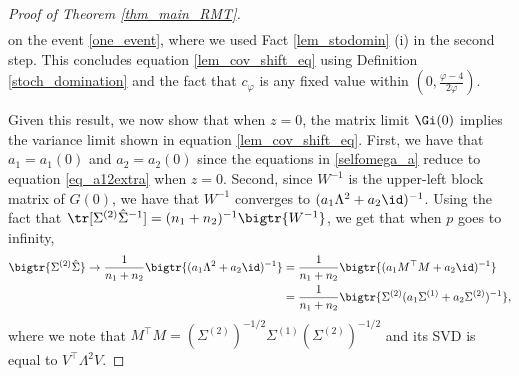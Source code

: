 \documentclass[aos,preprint]{imsart}
\begin{document}
\begin{proof}[Proof of Theorem \ref{thm_main_RMT}]
\begin{align*}
 \end{align*}
on the event \eqref{one_event}, where we used Fact \ref{lem_stodomin} (i) in the second step. 
This concludes equation \eqref{lem_cov_shift_eq} using Definition \ref{stoch_domination} and the fact that $c_{\varphi}$ is any fixed value within $(0, \frac{\varphi - 4}{2\varphi})$.  %

Given this result, we now show that when $z = 0$, the matrix limit $\Gi(0)$ implies the variance limit shown in equation \eqref{lem_cov_shift_eq}.
First, we have that $a_1 = a_1(0)$ and $a_2 = a_2(0)$ since the equations in \eqref{selfomega_a} reduce to equation \eqref{eq_a12extra} when $z=0$.
Second, since $W^{-1}$ is the upper-left block matrix of $G(0)$, we have that $W^{-1}$ converges to $ (a_1\Lambda^2 + a_2\id)^{-1} $.
Using the fact that $\tr[\Sigma^{(2)} \hat{\Sigma}^{-1}] = (n_1 + n_2)^{-1}\bigtr{W^{-1}} $, we get that when $p$ goes to infinity, %
\begin{align*}
  \bigtr{\Sigma^{(2)} \hat{\Sigma}} \rightarrow \frac{1}{n_1+n_2}\bigtr{(a_1 \Lambda^2 + a_2\id)^{-1}} &= \frac1{n_1+n_2}\bigtr{(a_1 M^{\top}M + a_2 \id)^{-1}} \\
  &=\frac{1}{n_1+n_2} \bigtr{\Sigma^{(2)} (a_1 \Sigma^{(1)} + a_2 \Sigma^{(2)})^{-1}},
  \end{align*}
where we note that $M^\top M = (\Sigma^{(2)})^{-1/2} \Sigma^{(1)} (\Sigma^{(2)})^{-1/2}$ and its SVD is equal to $V^{\top}\Lambda^2 V$.
\fi
 \end{proof}
\end{document}
